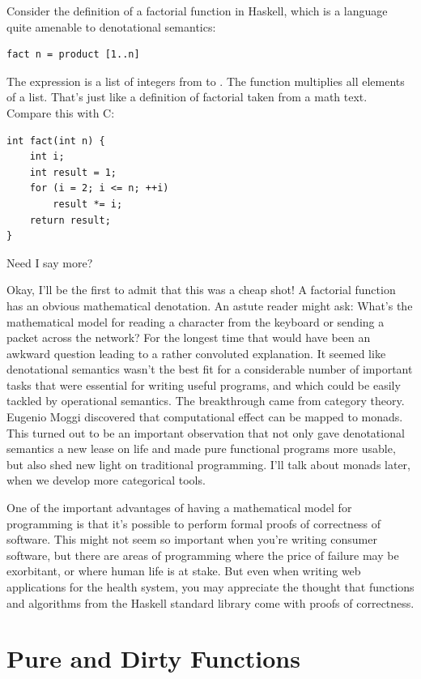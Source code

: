 Consider the definition of a factorial function in Haskell, which is a
language quite amenable to denotational semantics:

\begin{verbatim}
fact n = product [1..n]
\end{verbatim}
The expression \code{{[}1..n{]}} is a list of integers from  to .
The function  multiplies all elements of a list. That's
just like a definition of factorial taken from a math text. Compare this
with C:

\begin{verbatim}
int fact(int n) {
    int i;
    int result = 1;
    for (i = 2; i <= n; ++i)
        result *= i;
    return result;
}
\end{verbatim}
Need I say more?

Okay, I'll be the first to admit that this was a cheap shot! A factorial
function has an obvious mathematical denotation. An astute reader might
ask: What's the mathematical model for reading a character from the
keyboard or sending a packet across the network? For the longest time
that would have been an awkward question leading to a rather convoluted
explanation. It seemed like denotational semantics wasn't the best fit
for a considerable number of important tasks that were essential for
writing useful programs, and which could be easily tackled by
operational semantics. The breakthrough came from category theory.
Eugenio Moggi discovered that computational effect can be mapped to
monads. This turned out to be an important observation that not only
gave denotational semantics a new lease on life and made pure functional
programs more usable, but also shed new light on traditional
programming. I'll talk about monads later, when we develop more
categorical tools.

One of the important advantages of having a mathematical model for
programming is that it's possible to perform formal proofs of
correctness of software. This might not seem so important when you're
writing consumer software, but there are areas of programming where the
price of failure may be exorbitant, or where human life is at stake. But
even when writing web applications for the health system, you may
appreciate the thought that functions and algorithms from the Haskell
standard library come with proofs of correctness.

\section{Pure and Dirty Functions}\label{pure-and-dirty-functions}

